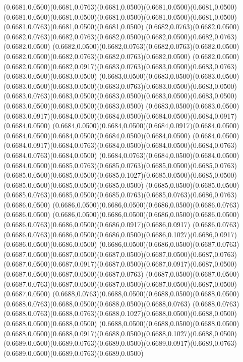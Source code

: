 (0.6681,0.0500)(0.6681,0.0763)(0.6681,0.0500)(0.6681,0.0500)(0.6681,0.0500)
\PST@Solid(0.6681,0.0500)(0.6681,0.0500)(0.6681,0.0500)(0.6681,0.0500)(0.6681,0.0500)(0.6681,0.0763)(0.6681,0.0500)(0.6681,0.0500)
(0.6682,0.0763)(0.6682,0.0500)(0.6682,0.0763)(0.6682,0.0763)(0.6682,0.0500)(0.6682,0.0500)(0.6682,0.0763)(0.6682,0.0500)
(0.6682,0.0500)(0.6682,0.0763)(0.6682,0.0763)(0.6682,0.0500)(0.6682,0.0500)(0.6682,0.0763)(0.6682,0.0763)(0.6682,0.0500)
(0.6682,0.0500)(0.6682,0.0500)(0.6682,0.0917)(0.6683,0.0763)(0.6683,0.0500)(0.6683,0.0763)(0.6683,0.0500)(0.6683,0.0500)
(0.6683,0.0500)(0.6683,0.0500)(0.6683,0.0500)(0.6683,0.0500)(0.6683,0.0500)(0.6683,0.0763)(0.6683,0.0500)(0.6683,0.0500)
(0.6683,0.0763)(0.6683,0.0500)(0.6683,0.0500)(0.6683,0.0500)(0.6683,0.0500)(0.6683,0.0500)(0.6683,0.0500)(0.6683,0.0500)
(0.6683,0.0500)(0.6683,0.0500)(0.6683,0.0917)(0.6684,0.0500)(0.6684,0.0500)(0.6684,0.0500)(0.6684,0.0917)(0.6684,0.0500)
(0.6684,0.0500)(0.6684,0.0500)(0.6684,0.0917)(0.6684,0.0500)(0.6684,0.0500)(0.6684,0.0500)(0.6684,0.0500)(0.6684,0.0500)
(0.6684,0.0500)(0.6684,0.0917)(0.6684,0.0763)(0.6684,0.0500)(0.6684,0.0500)(0.6684,0.0763)(0.6684,0.0763)(0.6684,0.0500)
(0.6684,0.0763)(0.6684,0.0500)(0.6684,0.0500)(0.6684,0.0500)(0.6685,0.0763)(0.6685,0.0763)(0.6685,0.0500)(0.6685,0.0763)
(0.6685,0.0500)(0.6685,0.0500)(0.6685,0.1027)(0.6685,0.0500)(0.6685,0.0500)(0.6685,0.0500)(0.6685,0.0500)(0.6685,0.0500)
(0.6685,0.0500)(0.6685,0.0500)(0.6685,0.0763)(0.6685,0.0500)(0.6685,0.0763)(0.6685,0.0763)(0.6686,0.0763)(0.6686,0.0500)
(0.6686,0.0500)(0.6686,0.0500)(0.6686,0.0500)(0.6686,0.0763)(0.6686,0.0500)
\PST@Solid(0.6686,0.0500)(0.6686,0.0500)(0.6686,0.0500)(0.6686,0.0500)(0.6686,0.0763)(0.6686,0.0500)(0.6686,0.0917)(0.6686,0.0917)
(0.6686,0.0763)(0.6686,0.0763)(0.6686,0.0500)(0.6686,0.0500)(0.6686,0.1027)(0.6686,0.0917)(0.6686,0.0500)(0.6686,0.0500)
(0.6686,0.0500)(0.6686,0.0500)(0.6687,0.0763)(0.6687,0.0500)(0.6687,0.0500)(0.6687,0.0500)(0.6687,0.0500)(0.6687,0.0763)
(0.6687,0.0500)(0.6687,0.0917)(0.6687,0.0500)(0.6687,0.0917)(0.6687,0.0500)(0.6687,0.0500)(0.6687,0.0500)(0.6687,0.0763)
(0.6687,0.0500)(0.6687,0.0500)(0.6687,0.0763)(0.6687,0.0500)(0.6687,0.0500)(0.6687,0.0500)(0.6687,0.0500)(0.6687,0.0500)
(0.6688,0.0763)(0.6688,0.0500)(0.6688,0.0500)(0.6688,0.0500)(0.6688,0.0763)(0.6688,0.0500)(0.6688,0.0500)(0.6688,0.0763)
(0.6688,0.0763)(0.6688,0.0763)(0.6688,0.0763)(0.6688,0.1027)(0.6688,0.0500)(0.6688,0.0500)(0.6688,0.0500)(0.6688,0.0500)
(0.6688,0.0500)(0.6688,0.0500)(0.6688,0.0500)(0.6688,0.0500)(0.6688,0.0917)(0.6688,0.0500)(0.6688,0.1027)(0.6688,0.0500)
(0.6689,0.0500)(0.6689,0.0763)(0.6689,0.0500)(0.6689,0.0917)(0.6689,0.0763)(0.6689,0.0500)(0.6689,0.0763)(0.6689,0.0500)
